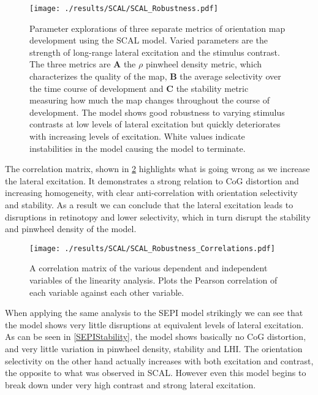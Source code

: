 \begin{figure}
	\centering
        \texttt{[image: ./results/SCAL/SCAL\_Robustness.pdf]}
	\caption{Parameter explorations of three separate metrics of
          orientation map development using the SCAL model. Varied
          parameters are the strength of long-range lateral excitation
          and the stimulus contrast. The three metrics are \textbf{A}
          the $\rho$ pinwheel density metric, which characterizes the
          quality of the map, \textbf{B} the average selectivity over
          the time course of development and \textbf{C} the stability
          metric measuring how much the map changes throughout the
          course of development. The model shows good robustness to
          varying stimulus contrasts at low levels of lateral
          excitation but quickly deteriorates with increasing levels
          of excitation. White values indicate instabilities in the
          model causing the model to terminate.}
	\label{SCALStability}
\end{figure}

The correlation matrix, shown in \ref{SCALRobustnessCorr} highlights
what is going wrong as we increase the lateral excitation. It
demonstrates a strong relation to CoG distortion and increasing
homogeneity, with clear anti-correlation with orientation selectivity
and stability. As a result we can conclude that the lateral excitation
leads to disruptions in retinotopy and lower selectivity, which in
turn disrupt the stability and pinwheel density of the model.

\begin{figure}
	\centering
       \texttt{[image: ./results/SCAL/SCAL\_Robustness\_Correlations.pdf]}
	\caption{A correlation matrix of the various dependent and
      independent variables of the linearity analysis. Plots the
      Pearson correlation of each variable against each other
      variable.}
	\label{SCALRobustnessCorr}
\end{figure}

When applying the same analysis to the SEPI model strikingly we can
see that the model shows very little disruptions at equivalent levels
of lateral excitation. As can be seen in \ref{SEPIStability}, the
model shows basically no CoG distortion, and very little variation in
pinwheel density, stability and LHI. The orientation selectivity on
the other hand actually increases with both excitation and contrast,
the opposite to what was observed in SCAL. However even this model
begins to break down under very high contrast and strong lateral
excitation.

